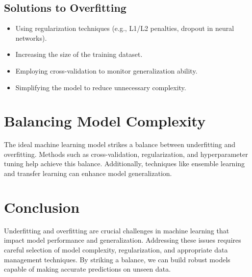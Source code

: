 \documentclass[conference]{IEEEtran}
\begin{document}
\subsection{Solutions to Overfitting}
\begin{itemize}
    \item Using regularization techniques (e.g., L1/L2 penalties, dropout in neural networks).
    \item Increasing the size of the training dataset.
    \item Employing cross-validation to monitor generalization ability.
    \item Simplifying the model to reduce unnecessary complexity.
\end{itemize}

\section{Balancing Model Complexity}
The ideal machine learning model strikes a balance between underfitting and overfitting. Methods such as cross-validation, regularization, and hyperparameter tuning help achieve this balance. Additionally, techniques like ensemble learning and transfer learning can enhance model generalization.

\section{Conclusion}
Underfitting and overfitting are crucial challenges in machine learning that impact model performance and generalization. Addressing these issues requires careful selection of model complexity, regularization, and appropriate data management techniques. By striking a balance, we can build robust models capable of making accurate predictions on unseen data.
\end{document}
